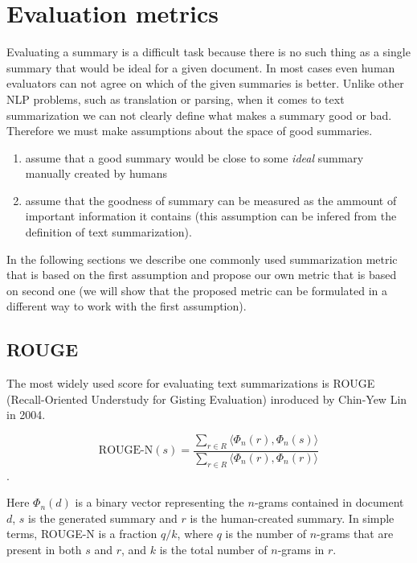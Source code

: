 \documentclass[sigplan]{acmart}
\begin{document}
\section{Evaluation metrics}
\label{sec:evaluation}

Evaluating a summary is a difficult task because there is no such thing as a single summary that would be ideal for a given document. In most cases even human evaluators can not agree on which of the given summaries is better\cite{das-7}. Unlike other NLP problems, such as translation or parsing, when it comes to text summarization we can not clearly define what makes a summary good or bad. Therefore we must make assumptions about the space of good summaries. 

\begin{enumerate}
\item assume that a good summary would be close to some \textit{ideal} summary manually created by humans
\item assume that the goodness of summary can be measured as the ammount of important information it contains (this assumption can be infered from the definition of text summarization).
\end{enumerate}

In the following sections we describe one commonly used summarization metric that is based on the first assumption and propose our own metric that is based on second one (we will show that the proposed metric can be formulated in a different way to work with the first assumption).

\subsection{ROUGE}
\label{sec:rouge}

The most widely used score for evaluating text summarizations is ROUGE (Recall-Oriented Understudy for Gisting Evaluation) inroduced by Chin-Yew Lin in 2004\cite{lin-4}.

\[ \text{ROUGE-N}(s) = \frac{\sum_{r \in R} \langle \Phi_n(r), \Phi_n(s) \rangle}{\sum_{r \in R} \langle \Phi_n(r), \Phi_n(r) \rangle} \].

Here $\Phi_n(d)$ is a binary vector representing the $n$-grams contained in document $d$, $s$ is the generated summary and $r$ is the human-created summary. In simple terms, ROUGE-N is a fraction $q/k$, where $q$ is the number of $n$-grams that are present in both $s$ and $r$, and $k$ is the total number of $n$-grams in $r$. 
\end{document}
